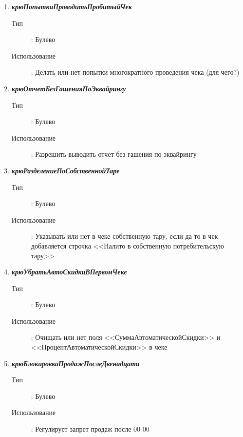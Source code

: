 \begin{enumerate}[label=(\arabic*)]
\vspace{\baselineskip}
\item \textbf{\textit{крюПопыткиПроводитьПробитыйЧек}}
\begin{description}
    \item[Тип] : Булево
    \item[Использование]: Делать или нет попытки многократного проведения чека (для чего?)
\end{description}


\vspace{\baselineskip}
\item \textbf{\textit{крюОтчетБезГашенияПоЭквайрингу}}
\begin{description}
    \item[Тип] : Булево
    \item[Использование]: Разрешить выводить отчет без гашения по эквайрингу
\end{description}



\vspace{\baselineskip}
\item \textbf{\textit{крюРазделениеПоСобственнойТаре}}
\begin{description}
    \item[Тип] : Булево
    \item[Использование]: Указывать или нет в чеке собственную тару, если да то в чек добавляется строчка <<Налито в собственную потребительскую тару>>
\end{description}

\vspace{\baselineskip}
\item \textbf{\textit{крюУбратьАвтоСкидкиВПервомЧеке}}
\begin{description}
    \item[Тип] : Булево
    \item[Использование]: Очищать или нет поля <<СуммаАвтоматическойСкидки>> и <<ПроцентАвтоматическойСкидки>> в чеке
\end{description}


\vspace{\baselineskip}
\item \textbf{\textit{крюБлокировкаПродажПослеДвенадцати}}
\begin{description}
    \item[Тип] : Булево
    \item[Использование]: Регулирует запрет продаж после 00-00
\end{description}


\end{enumerate}
